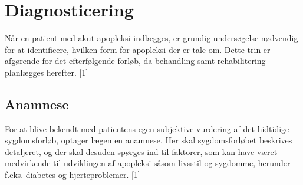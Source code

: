 
\section{Diagnosticering}

Når en patient med akut apopleksi indlægges, er grundig undersøgelse nødvendig for at identificere, hvilken form for apopleksi der er tale om. Dette trin er afgørende for det efterfølgende forløb, da behandling samt rehabilitering planlægges herefter. [1]

\subsection{Anamnese}
For at blive bekendt med patientens egen subjektive vurdering af det hidtidige sygdomsforløb, optager lægen en anamnese. Her skal sygdomsforløbet  beskrives detaljeret, og der skal desuden spørges ind til faktorer, som kan have været medvirkende til udviklingen af apopleksi såsom livsstil og sygdomme, herunder f.eks. diabetes og hjerteproblemer. [1]

